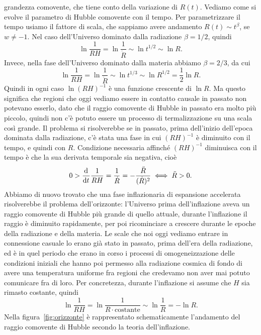grandezza comovente, che tiene conto della variazione di \(R(t)\).  Vediamo come
si evolve il parametro di Hubble comovente con il tempo.  Per parametrizzare il
tempo usiamo il fattore di scala, che sappiamo avere andamento \(R(t)\sim
t^{\beta}\), se \(w\neq -1\).  Nel caso dell'Universo dominato dalla radiazione
\(\beta = 1/2\), quindi
\begin{equation}
  \ln \frac{1}{RH} = \ln \frac{1}{\dot{R}} \sim \ln t^{1/2} \sim \ln R.
\end{equation}
Invece, nella fase dell'Universo dominato dalla materia abbiamo \(\beta = 2/3\),
da cui
\begin{equation}
  \ln \frac{1}{RH} = \ln \frac{1}{\dot{R}} \sim \ln t^{1/3} \sim \ln R^{1/2} =
  \frac{1}{2}\ln R.
\end{equation}
Quindi in ogni caso \(\ln (RH)^{-1}\) è una funzione crescente di \(\ln R\).  Ma
questo significa che regioni che oggi vediamo essere in contatto causale in
passato non potevano esserlo, dato che il raggio comovente di Hubble in passato
era molto più piccolo, quindi non c'è potuto essere un processo di
termalizzazione su una scala così grande.  Il problema si risolverebbe se in
passato, prima dell'inizio dell'epoca dominata dalla radiazione, c'è stata una
fase in cui \((RH)^{-1}\) è diminuito con il tempo, e quindi con \(R\).
Condizione necessaria affinché \((RH)^{-1}\) diminuisca con il tempo è che la
sua derivata temporale sia negativa, cioè
\begin{equation}
  0 > \frac{{\mathop{}\!\mathrm{d}^{}}}{\mathop{}\!\mathrm{d} {t}^{}} \frac{1}{RH} = \frac{1}{\dot{R}} =
  -\frac{\ddot{R}}{(\dot{R})^{2}} \iff \ddot{R}>0.
\end{equation}
Abbiamo di nuovo trovato che una fase inflazionaria di espansione accelerata
risolverebbe il problema dell'orizzonte: l'Universo prima dell'inflazione aveva
un raggio comovente di Hubble più grande di quello attuale, durante l'inflazione
il raggio è diminuito rapidamente, per poi ricominciare a crescere durante le
epoche della radiazione e della materia.  Le scale che noi oggi vediamo entrare
in connessione casuale lo erano già stato in passato, prima dell'era della
radiazione, ed è in quel periodo che erano in corso i processi di
omogeneizzazione delle condizioni iniziali che hanno poi permesso alla
radiazione cosmica di fondo di avere una temperatura uniforme fra regioni che
credevamo non aver mai potuto comunicare fra di loro.  Per concretezza, durante
l'inflazione si assume che \(H\) sia rimasto costante, quindi
\begin{equation}
  \ln \frac{1}{RH} = \ln \frac{1}{R \cdot \text{costante}} \sim \ln \frac{1}{R}
  = - \ln R.
\end{equation}
Nella figura~\ref{fig:orizzonte} è rappresentato schematicamente l'andamento del
raggio comovente di Hubble secondo la teoria dell'inflazione.

